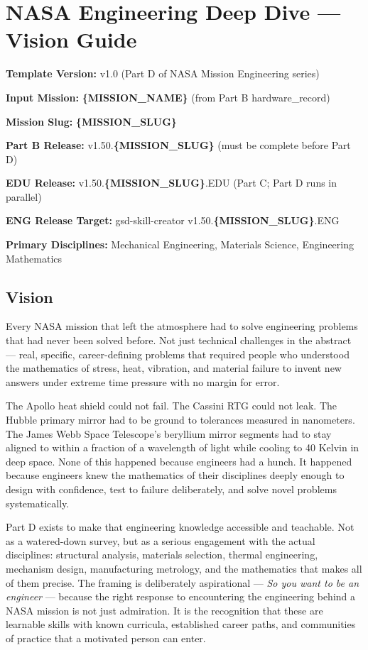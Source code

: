 \documentclass[11pt,letterpaper]{article}
\newcommand{\stageheader}[2]{%
  \noindent\colorbox{#2}{\makebox[\textwidth][l]{%
    \textcolor{white}{\bfseries\sffamily\hspace{6pt}#1\hspace{6pt}}}}%
  \vspace{0.5em}\par%
}
\newcommand{\metafield}[2]{\textbf{\sffamily #1} #2\par}
\newcommand{\param}[1]{\textcolor{paramred}{\textbf{\{#1\}}}}
\begin{document}
\newpage
\tableofcontents
\newpage

\stageheader{STAGE 1 --- VISION DOCUMENT}{primary}

\section{NASA Engineering Deep Dive --- Vision Guide}

\metafield{Template Version:}{v1.0 (Part D of NASA Mission Engineering series)}
\metafield{Input Mission:}{\param{MISSION\_NAME} (from Part B hardware\_record)}
\metafield{Mission Slug:}{\param{MISSION\_SLUG}}
\metafield{Part B Release:}{v1.50.\param{MISSION\_SLUG} (must be complete before Part D)}
\metafield{EDU Release:}{v1.50.\param{MISSION\_SLUG}.EDU (Part C; Part D runs in parallel)}
\metafield{ENG Release Target:}{gsd-skill-creator v1.50.\param{MISSION\_SLUG}.ENG}
\metafield{Primary Disciplines:}{Mechanical Engineering, Materials Science, Engineering Mathematics}

\subsection{Vision}

Every NASA mission that left the atmosphere had to solve engineering problems that had never been solved before. Not just technical challenges in the abstract --- real, specific, career-defining problems that required people who understood the mathematics of stress, heat, vibration, and material failure to invent new answers under extreme time pressure with no margin for error.

The Apollo heat shield could not fail. The Cassini RTG could not leak. The Hubble primary mirror had to be ground to tolerances measured in nanometers. The James Webb Space Telescope's beryllium mirror segments had to stay aligned to within a fraction of a wavelength of light while cooling to 40 Kelvin in deep space. None of this happened because engineers had a hunch. It happened because engineers knew the mathematics of their disciplines deeply enough to design with confidence, test to failure deliberately, and solve novel problems systematically.

Part D exists to make that engineering knowledge accessible and teachable. Not as a watered-down survey, but as a serious engagement with the actual disciplines: structural analysis, materials selection, thermal engineering, mechanism design, manufacturing metrology, and the mathematics that makes all of them precise. The framing is deliberately aspirational --- \textit{So you want to be an engineer} --- because the right response to encountering the engineering behind a NASA mission is not just admiration. It is the recognition that these are learnable skills with known curricula, established career paths, and communities of practice that a motivated person can enter.
\end{document}
